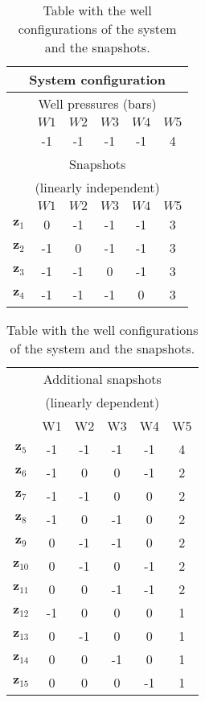 \documentclass[12pt]{article}
\numberwithin{equation}{section}
\begin{document}
\begin{table}[!ht]\centering
\begin{minipage}{.45\textwidth}
\vspace{-10pt}
\centering
\begin{tabular}{ |c|c|c|c|c|c|} 
 \hline
  \multicolumn{6}{|c|}{System configuration} \\ 
  \hline
  \multicolumn{6}{|c|}{Well pressures (bars)}\\
  \hline
  &$W1$ &$W2$ &$W3$ &$W4$ &$W5$ \\
  \hline
&-1 & -1& -1& -1& 4\\
\hline
\multicolumn{6}{|c|}{Snapshots } \\
\multicolumn{6}{|c|}{ (linearly independent)} \\
\hline
 &$W1$ &$W2$ &$W3$ &$W4$ &$W5$ \\
  \hline

$\mathbf{z}_1$& 0&-1 &-1 &-1 &3 \\
$\mathbf{z}_2$& -1&0 &-1 &-1 &3  \\
$\mathbf{z}_3$& -1&-1 &0 &-1 &3  \\
$\mathbf{z}_4$& -1&-1 &-1 &0 &3  \\
 \hline
 \end{tabular}
\label{table:case2}\end{minipage}%
\hspace{15pt}
 \begin{minipage}{.45\textwidth}
 \begin{tabular}{ |c|c|c|c|c|c|} 
 \hline
 \multicolumn{6}{|c|}{Additional snapshots} \\
 \multicolumn{6}{|c|}{ (linearly dependent)} \\
\hline
 &W1 &W2 &W3 &W4 &W5 \\
  \hline
$\mathbf{z}_5$& -1&-1 &-1 &-1 &4  \\
$\mathbf{z}_6$& -1&0 &0 &-1 &2  \\
$\mathbf{z}_7$& -1&-1 &0 &0 &2  \\
$\mathbf{z}_8$& -1&0 &-1 &0 &2  \\
$\mathbf{z}_9$& 0&-1 &-1 &0 &2  \\
$\mathbf{z}_{10}$& 0&-1 &0 &-1 &2  \\
$\mathbf{z}_{11}$& 0&0 &-1 &-1 &2  \\
$\mathbf{z}_{12}$& -1&0 &0 &0 &1  \\
$\mathbf{z}_{13}$& 0&-1 &0 &0 &1  \\
$\mathbf{z}_{14}$& 0&0 &-1 &0 &1  \\
$\mathbf{z}_{15}$& 0&0 &0 &-1 &1  \\
 \hline
 \end{tabular}

\end{minipage}\caption{Table with the well configurations of the system and the snapshots.}
\vspace{-10pt}\label{table:sc}
\end{table}
\end{document}
